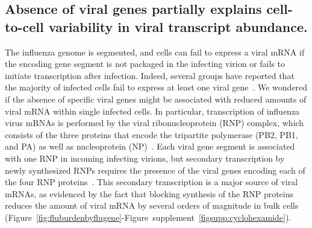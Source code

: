 \documentclass[9pt,lineno]{elife}
\begin{document}
\subsection{Absence of viral genes partially explains cell-to-cell variability in viral transcript abundance.}
The influenza genome is segmented, and cells can fail to express a viral mRNA if the encoding gene segment is not packaged in the infecting virion or fails to initiate transcription after infection.
Indeed, several groups have reported that the majority of infected cells fail to express at least one viral gene~\citep{Brooke:2013kb, Heldt:2015iz,Dou:2017cp}. 
We wondered if the absence of specific viral genes might be associated with reduced amounts of viral mRNA within single infected cells.
In particular, transcription of influenza virus mRNAs is performed by the viral ribonucleoprotein (RNP) complex, which consists of the three proteins that encode the tripartite polymerase (PB2, PB1, and PA) as well as nucleoprotein (NP)~\citep{huang1990determination}.
Each viral gene segment is associated with one RNP in incoming infecting virions, but secondary transcription by newly synthesized RNPs requires the presence of the viral genes encoding each of the four RNP proteins~\citep{Vreede:2004ip,eisfeld2015centre}.
This secondary transcription is a major source of viral mRNAs, as evidenced by the fact that blocking synthesis of the RNP proteins reduces the amount of viral mRNA by several orders of magnitude in bulk cells (Figure~\ref{fig:fluburdenbyflugene}-Figure~supplement~\ref{figsupp:cyclohexamide}).
\end{document}
